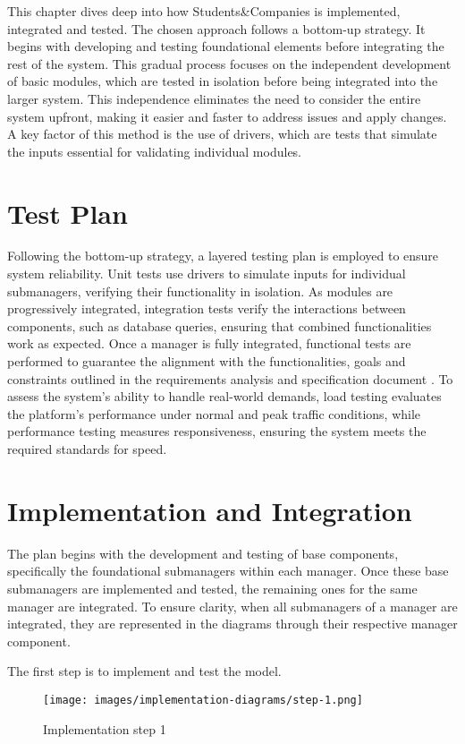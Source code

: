 This chapter dives deep into how Students\&Companies is implemented, integrated and tested.
The chosen approach follows a bottom-up strategy.
It begins with developing and testing foundational elements before integrating the rest of the system.
This gradual process focuses on the independent development of basic modules, which are tested in isolation before being integrated into the larger system.
This independence eliminates the need to consider the entire system upfront, making it easier and faster to address issues and apply changes.
A key factor of this method is the use of drivers, which are tests that simulate the inputs essential for validating individual modules.

\section{Test Plan}
Following the bottom-up strategy, a layered testing plan is employed to ensure system reliability.
Unit tests use drivers to simulate inputs for individual submanagers, verifying their functionality in isolation.
As modules are progressively integrated, integration tests verify the interactions between components, such as database queries, ensuring that combined functionalities work as expected.
Once a manager is fully integrated, functional tests are performed to guarantee the alignment with the functionalities, goals and constraints outlined in the requirements analysis and specification document \cite{carraracurrodossi2024}.
To assess the system's ability to handle real-world demands, load testing evaluates the platform's performance under normal and peak traffic conditions, while performance testing measures responsiveness, ensuring the system meets the required standards for speed.

\section{Implementation and Integration}
The plan begins with the development and testing of base components, specifically the foundational submanagers within each manager.
Once these base submanagers are implemented and tested, the remaining ones for the same manager are integrated. 
To ensure clarity, when all submanagers of a manager are integrated, they are represented in the diagrams through their respective manager component.

\clearpage
The first step is to implement and test the model.

\begin{figure}[h]
    \centering
    \texttt{[image: images/implementation-diagrams/step-1.png]}
    \caption{Implementation step 1}
\end{figure}

